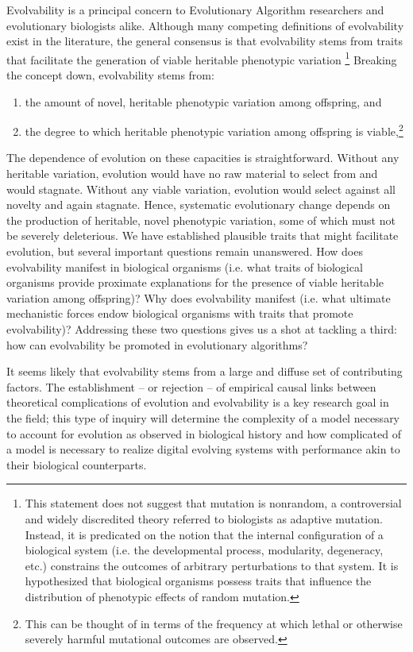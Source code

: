 Evolvability is a principal concern to Evolutionary Algorithm researchers and evolutionary biologists alike. Although many competing definitions of evolvability exist in the literature, the general consensus is that evolvability stems from traits that facilitate the generation of viable heritable phenotypic variation \cite{Tarapore2015EvolvabilityBenchmarks}\footnote{This statement does not suggest that mutation is nonrandom, a controversial and widely discredited theory referred to biologists as adaptive mutation. Instead, it is predicated on the notion that the internal configuration of a biological system (i.e. the developmental process, modularity, degeneracy, etc.) constrains the outcomes of arbitrary perturbations to that system. It is hypothesized that biological organisms possess traits that influence the distribution of phenotypic effects of random mutation.} Breaking the concept down, evolvability stems from:
\begin{enumerate}
\item the amount of novel, heritable phenotypic variation among offspring, and
\item the degree to which heritable phenotypic variation among offspring is viable,\footnote{This can be thought of in terms of the frequency at which lethal or otherwise severely harmful mutational outcomes are observed.}
\end{enumerate}
The dependence of evolution on these capacities is straightforward. Without any heritable variation, evolution would have no raw material to select from and would stagnate. Without any viable variation, evolution would select against all novelty and again stagnate. Hence, systematic evolutionary change depends on the production of heritable, novel phenotypic variation, some of which must not be severely deleterious. We have established plausible traits that might facilitate evolution, but several important questions remain unanswered. How does evolvability manifest in biological organisms (i.e. what traits of biological organisms provide proximate explanations for the presence of viable heritable variation among offspring)? Why does evolvability manifest (i.e. what ultimate mechanistic forces endow biological organisms with traits that promote evolvability)? Addressing these two questions gives us a shot at tackling a third: how can evolvability be promoted in evolutionary algorithms?

It seems likely that evolvability stems from a large and diffuse set of contributing factors. The establishment -- or rejection -- of empirical causal links between theoretical complications of evolution and evolvability is a key research goal in the field; this type of inquiry will determine the complexity of a model necessary to account for evolution as observed in biological history and how complicated of a model is necessary to realize digital evolving systems with performance akin to their biological counterparts.

